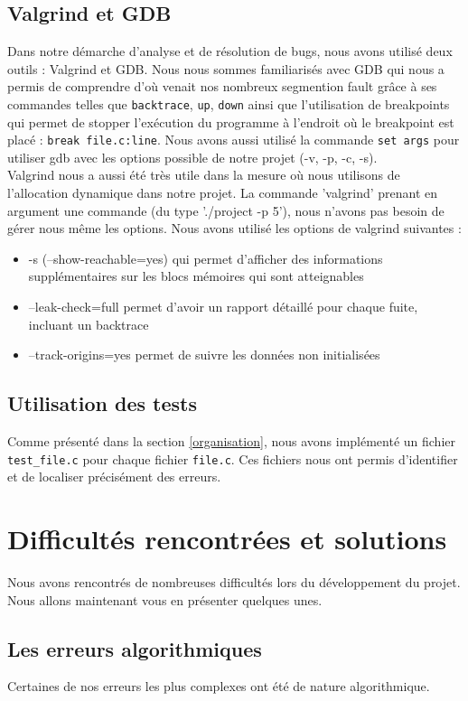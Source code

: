\documentclass[a4paper,12pt]{report}
\begin{document}
\section{Valgrind et GDB}
Dans notre démarche d'analyse et de résolution de bugs, nous avons utilisé deux outils : Valgrind et GDB. 
Nous nous sommes familiarisés avec GDB qui nous a permis de comprendre d'où venait nos nombreux segmention fault grâce à ses commandes telles que \texttt{backtrace}, \texttt{up}, \texttt{down} ainsi que l'utilisation de breakpoints qui permet de stopper l'exécution du programme à l'endroit où le breakpoint est placé : \texttt{break file.c:line}. Nous avons aussi utilisé la commande \texttt{set args} pour utiliser gdb avec les options possible de notre projet (-v, -p, -c, -s).\\
Valgrind nous a aussi été très utile dans la mesure où nous utilisons de l'allocation dynamique dans notre projet. La commande 'valgrind' prenant en argument une commande (du type './project -p 5'), nous n'avons pas besoin de gérer nous même les options. Nous avons utilisé les options de valgrind suivantes : 
\begin{itemize}
    \item -s (--show-reachable=yes) qui permet d'afficher des informations supplémentaires sur les blocs mémoires qui sont atteignables
    \item --leak-check=full permet d'avoir un rapport détaillé pour chaque fuite, incluant un backtrace
    \item --track-origins=yes permet de suivre les données non initialisées
\end{itemize}
\section{Utilisation des tests}
Comme présenté dans la section \ref{organisation}, nous avons implémenté un fichier \texttt{test\_file.c} pour chaque fichier \texttt{file.c}. Ces fichiers nous ont permis d'identifier et de localiser précisément des erreurs.

\chapter{Difficultés rencontrées et solutions}
Nous avons rencontrés de nombreuses difficultés lors du développement du projet. Nous allons maintenant vous en présenter quelques unes.
\section{Les erreurs algorithmiques}
Certaines de nos erreurs les plus complexes ont été de nature algorithmique.
\end{document}
